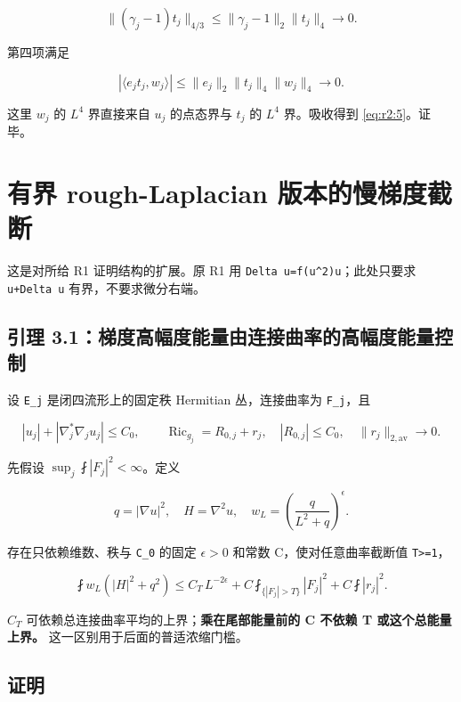 \documentclass[UTF8,11pt,openany,oneside,fontset=none]{ctexbook}
\begin{document}
\[
 \|(\gamma_j-1)t_j\|_{4/3}
 \le\|\gamma_j-1\|_2\|t_j\|_4\to0.
\]

第四项满足

\[
 |\langle e_jt_j,w_j\rangle|
 \le\|e_j\|_2\|t_j\|_4\|w_j\|_4\to0.
\]

这里 \(w_j\) 的 \(L^4\) 界直接来自 \(u_j\) 的点态界与 \(t_j\) 的 \(L^4\) 界。吸收得到 \eqref{eq:r2:5}。证毕。

\section{有界 rough-Laplacian 版本的慢梯度截断}\label{ch2:ux6709ux754c-rough-laplacian-ux7248ux672cux7684ux6162ux68afux5ea6ux622aux65ad}

这是对所给 R1 证明结构的扩展。原 R1 用 \texttt{Delta\ u=f(\textbar{}u\textbar{}\^{}2)u}；此处只要求 \texttt{\textbar{}u\textbar{}+\textbar{}Delta\ u\textbar{}} 有界，不要求微分右端。

\subsection{引理 3.1：梯度高幅度能量由连接曲率的高幅度能量控制}\label{ch2:ux5f15ux7406-3.1ux68afux5ea6ux9ad8ux5e45ux5ea6ux80fdux91cfux7531ux8fdeux63a5ux66f2ux7387ux7684ux9ad8ux5e45ux5ea6ux80fdux91cfux63a7ux5236}

设 \texttt{E\_j} 是闭四流形上的固定秩 Hermitian 丛，连接曲率为 \texttt{F\_j}，且

\[
 |u_j|+|\nabla_j^*\nabla_j u_j|\le C_0,\qquad
 \operatorname{Ric}_{g_j}=R_{0,j}+r_j,\quad |R_{0,j}|\le C_0,\quad
 \|r_j\|_{2,\mathrm{av}}\to0.
 \tag{2.11}\label{eq:r2:11}
\]

先假设 \(\sup_j\fint|F_j|^2<\infty\)。定义

\[
 q=|\nabla u|^2,\quad H=\nabla^2u,\quad
 w_L=\left(\frac q{L^2+q}\right)^\epsilon.
\]

存在只依赖维数、秩与 \texttt{C\_0} 的固定 \(\epsilon>0\) 和常数 C，使对任意曲率截断值 \texttt{T\textgreater{}=1}，

\[
 \boxed{
 \fint w_L(|H|^2+q^2)
 \le C_T\,L^{-2\epsilon}
 +C\fint_{\{|F_j|>T\}}|F_j|^2
 +C\fint|r_j|^2.}
 \tag{2.12}\label{eq:r2:12}
\]

\(C_T\) 可依赖总连接曲率平均的上界；\textbf{乘在尾部能量前的 C 不依赖 T 或这个总能量上界。} 这一区别用于后面的普适浓缩门槛。

\subsection{证明}\label{ch2:ux8bc1ux660e-1}
\end{document}
